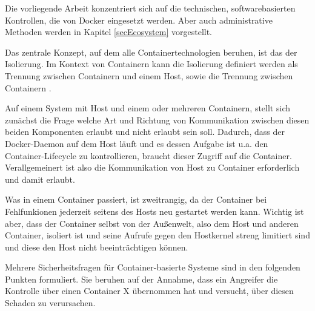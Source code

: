 \documentclass[../main.tex]{subfiles}
\begin{document}
  Die vorliegende Arbeit konzentriert sich auf die technischen, softwarebasierten Kontrollen, die von Docker eingesetzt werden. Aber auch administrative Methoden werden in Kapitel \ref{secEcosystem} vorgestellt.





  Das zentrale Konzept, auf dem alle Containertechnologien beruhen, ist das der Isolierung. Im Kontext von Containern kann die Isolierung definiert werden als Trennung zwischen Containern und einem Host, sowie die Trennung zwischen Containern \cite[S.1]{dockerSec2}.

  Auf einem System mit Host und einem oder mehreren Containern, stellt sich zunächst die Frage welche Art und Richtung von Kommunikation zwischen diesen beiden Komponenten erlaubt und nicht erlaubt sein soll. Dadurch, dass der Docker-Daemon auf dem Host läuft und es dessen Aufgabe ist u.a. den Container-Lifecycle zu kontrollieren, braucht dieser Zugriff auf die Container. Verallgemeinert ist also die Kommunikation von Host zu Container erforderlich und damit erlaubt.

  Was in einem Container passiert, ist zweitrangig, da der Container bei Fehlfunkionen jederzeit seitens des Hosts neu gestartet werden kann. Wichtig ist aber, dass der Container selbst von der Außenwelt, also dem Host und anderen Container, isoliert ist und seine Aufrufe gegen den Hostkernel streng limitiert sind und diese den Host nicht beeinträchtigen können.

  Mehrere Sicherheitsfragen für Container-basierte Systeme sind in den folgenden Punkten formuliert. Sie beruhen auf der Annahme, dass ein Angreifer die Kontrolle über einen Container X übernommen hat und versucht, über diesen Schaden zu verursachen.
\end{document}
